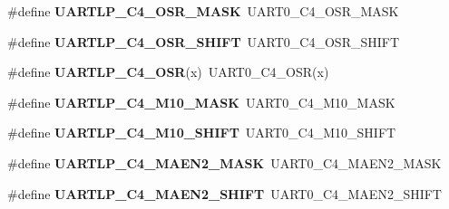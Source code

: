 \begin{DoxyCompactItemize}
\item 
\mbox{\label{group___backward___compatibility___symbols_gac6bfd7069bc2ce77d0aff3aecdd3d330}} 
\#define {\bfseries U\+A\+R\+T\+L\+P\+\_\+\+C4\+\_\+\+O\+S\+R\+\_\+\+M\+A\+SK}~U\+A\+R\+T0\+\_\+\+C4\+\_\+\+O\+S\+R\+\_\+\+M\+A\+SK
\item 
\mbox{\label{group___backward___compatibility___symbols_gafb1dd8f9e942cb49f32e0be294bee876}} 
\#define {\bfseries U\+A\+R\+T\+L\+P\+\_\+\+C4\+\_\+\+O\+S\+R\+\_\+\+S\+H\+I\+FT}~U\+A\+R\+T0\+\_\+\+C4\+\_\+\+O\+S\+R\+\_\+\+S\+H\+I\+FT
\item 
\mbox{\label{group___backward___compatibility___symbols_gaa2d2ca8670df8b5afd119267a50ee9d7}} 
\#define {\bfseries U\+A\+R\+T\+L\+P\+\_\+\+C4\+\_\+\+O\+SR}(x)~U\+A\+R\+T0\+\_\+\+C4\+\_\+\+O\+SR(x)
\item 
\mbox{\label{group___backward___compatibility___symbols_gae6f095de7ec64e7c5f070cace84825f2}} 
\#define {\bfseries U\+A\+R\+T\+L\+P\+\_\+\+C4\+\_\+\+M10\+\_\+\+M\+A\+SK}~U\+A\+R\+T0\+\_\+\+C4\+\_\+\+M10\+\_\+\+M\+A\+SK
\item 
\mbox{\label{group___backward___compatibility___symbols_ga5bf55e06cfac817fc0cc879b5bd8df17}} 
\#define {\bfseries U\+A\+R\+T\+L\+P\+\_\+\+C4\+\_\+\+M10\+\_\+\+S\+H\+I\+FT}~U\+A\+R\+T0\+\_\+\+C4\+\_\+\+M10\+\_\+\+S\+H\+I\+FT
\item 
\mbox{\label{group___backward___compatibility___symbols_ga90e33c5bb1be6d39e1d0f937253daf0b}} 
\#define {\bfseries U\+A\+R\+T\+L\+P\+\_\+\+C4\+\_\+\+M\+A\+E\+N2\+\_\+\+M\+A\+SK}~U\+A\+R\+T0\+\_\+\+C4\+\_\+\+M\+A\+E\+N2\+\_\+\+M\+A\+SK
\item 
\mbox{\label{group___backward___compatibility___symbols_ga9b129e14e5aac5ef9707937d91fd0046}} 
\#define {\bfseries U\+A\+R\+T\+L\+P\+\_\+\+C4\+\_\+\+M\+A\+E\+N2\+\_\+\+S\+H\+I\+FT}~U\+A\+R\+T0\+\_\+\+C4\+\_\+\+M\+A\+E\+N2\+\_\+\+S\+H\+I\+FT
\item 
\mbox{\label{group___backward___compatibility___symbols_gaf8e8a31f6af1dbfe4e930d0c7bffe375}} 

\end{DoxyCompactItemize}
